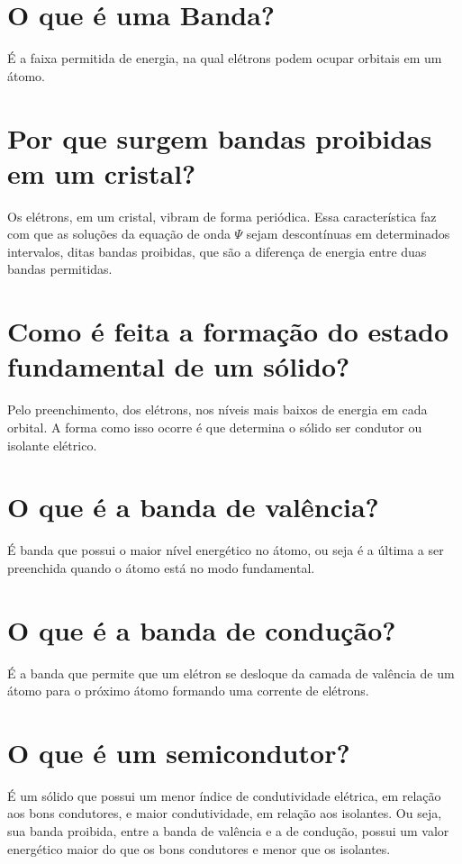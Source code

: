 \section*{O que é uma Banda?}
\label{q2}

É a faixa permitida de energia, na qual elétrons podem ocupar orbitais
em um átomo.

\section*{Por que surgem bandas proibidas em um cristal?}
\label{q3}

Os  elétrons,  em   um  cristal,  vibram  de   forma  periódica.  Essa
característica faz com que as soluções da equação de onda $\Psi$ sejam
descontínuas em  determinados intervalos, ditas bandas  proibidas, que
são a diferença de energia entre duas bandas permitidas.

\section*{Como é feita a formação do estado fundamental de um sólido?}
\label{q4}

Pelo preenchimento, dos elétrons, nos níveis mais baixos de energia em
cada orbital.  A forma como isso  ocorre é que determina  o sólido ser
condutor ou isolante elétrico.

\section*{O que é a banda de valência?}
\label{q5}

É banda que possui o maior nível energético no átomo, ou seja é a
última a ser preenchida quando o átomo está no modo fundamental.

\section*{O que é a banda de condução?}
\label{q6}

É a banda que permite que um elétron se desloque da camada de valência de um
átomo para o próximo átomo formando uma corrente de elétrons.

\section*{O que é um semicondutor?}
\label{q7}

É um sólido  que possui um menor índice de  condutividade elétrica, em
relação aos  bons condutores,  e maior  condutividade, em  relação aos
isolantes. Ou seja, sua banda proibida,  entre a banda de valência e a
de  condução,  possui  um  valor  energético  maior  do  que  os  bons
condutores e menor que os isolantes.

